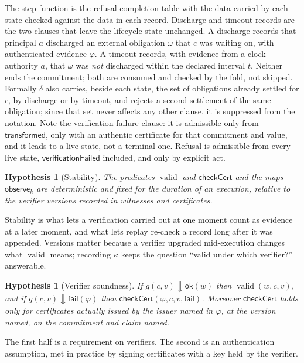 \documentclass[11pt,openany]{book}
\newtheorem{hypothesis}[theorem]{Hypothesis}
\theoremstyle{remark}
\newcommand{\valid}{\operatorname{valid}}
\begin{document}
The step function is the refusal completion table with the data carried
by each state checked against the data in each record. Discharge and
timeout records are the two clauses that leave the lifecycle state
unchanged. A discharge records that principal $a$ discharged an external
obligation $\omega$ that $c$ was waiting on, with authenticated evidence
$\varphi$. A timeout records, with evidence from a clock authority $a$,
that $\omega$ was \emph{not} discharged within the declared interval $t$.
Neither ends the commitment; both are consumed and checked by the fold, not
skipped. Formally $\delta$ also carries, beside each state, the set of
obligations already settled for $c$, by discharge or by timeout, and
rejects a second settlement of the same obligation; since that set never
affects any other clause, it is suppressed from the notation. Note the
verification-failure clause: it is admissible only from
$\mathsf{transformed}$, only with an authentic certificate for that
commitment and value, and it leads to a live state, not a terminal one.
Refusal is admissible from every live state, $\mathsf{verificationFailed}$
included, and only by explicit act.

\begin{hypothesis}[Stability]\label{hyp:stable}
The predicates $\valid$ and $\mathsf{checkCert}$ and the maps
$\mathsf{observe}_k$ are deterministic and fixed for the duration of an
execution, relative to the verifier versions recorded in witnesses and
certificates.
\end{hypothesis}

Stability is what lets a verification carried out at one moment count as
evidence at a later moment, and what lets replay re-check a record long
after it was appended. Versions matter because a verifier upgraded
mid-execution changes what $\valid$ means; recording $\kappa$ keeps the
question ``valid under which verifier?'' answerable.

\begin{hypothesis}[Verifier soundness]\label{hyp:verifier}
If $g(c,v)\Downarrow\mathsf{ok}(w)$ then $\valid(w,c,v)$, and if
$g(c,v)\Downarrow\mathsf{fail}(\varphi)$ then
$\mathsf{checkCert}(\varphi,c,v,\mathsf{fail})$. Moreover
$\mathsf{checkCert}$ holds only for certificates actually issued by the
issuer named in $\varphi$, at the version named, on the commitment and
claim named.
\end{hypothesis}

The first half is a requirement on verifiers. The second is an
authentication assumption, met in practice by signing certificates with a
key held by the verifier.
\end{document}
